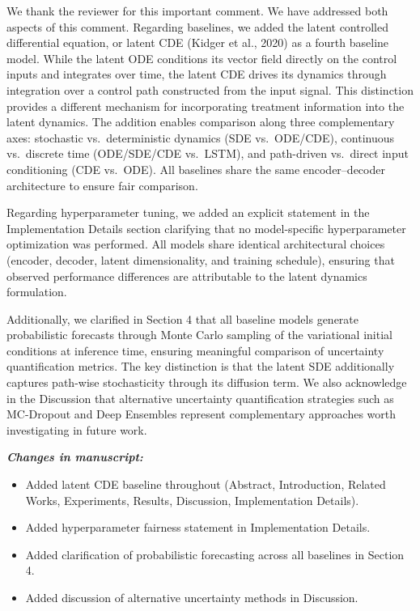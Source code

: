 \documentclass[12pt]{article}
\newcommand{\changes}{\vspace{0.3em}\noindent\textbf{\textit{Changes in manuscript:}}\vspace{0.2em}}
\begin{document}
We thank the reviewer for this important comment. We have addressed both aspects of this comment. Regarding baselines, we added the latent controlled differential equation, or latent CDE (Kidger et al., 2020) as a fourth baseline model. While the latent ODE conditions its vector field directly on the control inputs and integrates over time, the latent CDE drives its dynamics through integration over a control path constructed from the input signal. This distinction provides a different mechanism for incorporating treatment information into the latent dynamics. The addition enables comparison along three complementary axes: stochastic vs.\ deterministic dynamics (SDE vs.\ ODE/CDE), continuous vs.\ discrete time (ODE/SDE/CDE vs.\ LSTM), and path-driven vs.\ direct input conditioning (CDE vs.\ ODE). All baselines share the same encoder--decoder architecture to ensure fair comparison.

Regarding hyperparameter tuning, we added an explicit statement in the Implementation Details section clarifying that no model-specific hyperparameter optimization was performed. All models share identical architectural choices (encoder, decoder, latent dimensionality, and training schedule), ensuring that observed performance differences are attributable to the latent dynamics formulation.

Additionally, we clarified in Section 4 that all baseline models generate probabilistic forecasts through Monte Carlo sampling of the variational initial conditions at inference time, ensuring meaningful comparison of uncertainty quantification metrics. The key distinction is that the latent SDE additionally captures path-wise stochasticity through its diffusion term. We also acknowledge in the Discussion that alternative uncertainty quantification strategies such as MC-Dropout and Deep Ensembles represent complementary approaches worth investigating in future work.

\changes
\begin{itemize}[leftmargin=2em]
\item Added latent CDE baseline throughout (Abstract, Introduction, Related Works, Experiments, Results, Discussion, Implementation Details).
\item Added hyperparameter fairness statement in Implementation Details.
\item Added clarification of probabilistic forecasting across all baselines in Section 4.
\item Added discussion of alternative uncertainty methods in Discussion.
\end{itemize}
\end{document}
